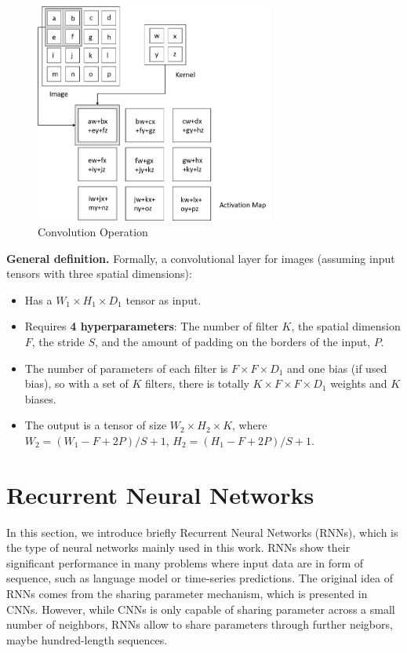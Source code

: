 \begin{figure}[h!]
    \begin{center}
        \includegraphics[width=0.7\textwidth]{figures/chap2/cnn.png}
        \caption{Convolution Operation \cite{dlbook}}
        \label{fig:cnn}
    \end{center}
\end{figure}

\textbf{General definition.} Formally, a convolutional layer for images (assuming input tensors with three spatial dimensions):
\begin{itemize}
    \item Has a $\displaystyle W_1 \times H_1 \times D_1$ tensor as input.
    \item Requires \textbf{4 hyperparameters}: The number of filter $\displaystyle K$, the spatial dimension $\displaystyle F$, the stride $\displaystyle S$, and the amount of padding on the borders of the input, $\displaystyle P$.
    \item The number of parameters of each filter is $\displaystyle F \times F \times D_1$ and one bias (if used bias), so with a set of $\displaystyle K$ filters, there is totally $\displaystyle K \times F \times F \times D_1$ weights and $\displaystyle K$ biases.
    \item The output is a tensor of size $\displaystyle W_2 \times H_2 \times K$, where $\displaystyle W_2 = (W_1 - F + 2P)/S + 1$, $\displaystyle H_2 = (H_1 - F + 2P)/S + 1$.
\end{itemize}

\section{Recurrent Neural Networks}
In this section, we introduce briefly Recurrent Neural Networks (RNNs), which is the type of neural networks mainly used in this work. RNNs show their significant performance in many problems where input data are in form of sequence, such as language model or time-series predictions. The original idea of RNNs comes from the sharing parameter mechanism, which is presented in CNNs. However, while CNNs is only capable of sharing parameter across a small number of neighbors, RNNs allow to share parameters through further neigbors, maybe hundred-length sequences.  

